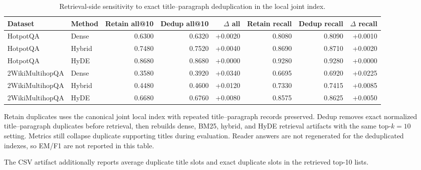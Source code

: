 \begin{table}[t]
\centering
\caption{Retrieval-side sensitivity to exact title--paragraph deduplication in the local joint index.}
\label{tab:dedup_retrieval_sensitivity}
\scriptsize
\begin{threeparttable}
\setlength{\tabcolsep}{4pt}
\begin{tabularx}{\textwidth}{>{\raggedright\arraybackslash}X l r r r r r r}
\toprule
Dataset & Method & Retain all@10 & Dedup all@10 & $\Delta$ all & Retain recall & Dedup recall & $\Delta$ recall \\
\midrule
HotpotQA & Dense & 0.6300 & 0.6320 & +0.0020 & 0.8080 & 0.8090 & +0.0010 \\
HotpotQA & Hybrid & 0.7480 & 0.7520 & +0.0040 & 0.8690 & 0.8710 & +0.0020 \\
HotpotQA & HyDE & 0.8680 & 0.8680 & +0.0000 & 0.9280 & 0.9280 & +0.0000 \\
2WikiMultihopQA & Dense & 0.3580 & 0.3920 & +0.0340 & 0.6695 & 0.6920 & +0.0225 \\
2WikiMultihopQA & Hybrid & 0.4480 & 0.4600 & +0.0120 & 0.7330 & 0.7415 & +0.0085 \\
2WikiMultihopQA & HyDE & 0.6680 & 0.6760 & +0.0080 & 0.8575 & 0.8625 & +0.0050 \\
\bottomrule
\end{tabularx}
\begin{tablenotes}
\footnotesize
\item Retain duplicates uses the canonical joint local index with repeated title--paragraph records preserved. Dedup removes exact normalized title--paragraph duplicates before retrieval, then rebuilds dense, BM25, hybrid, and HyDE retrieval artifacts with the same top-$k=10$ setting. Metrics still collapse duplicate supporting titles during evaluation. Reader answers are not regenerated for the deduplicated indexes, so EM/F1 are not reported in this table.
\item The CSV artifact additionally reports average duplicate title slots and exact duplicate slots in the retrieved top-10 lists.
\end{tablenotes}
\end{threeparttable}
\end{table}
